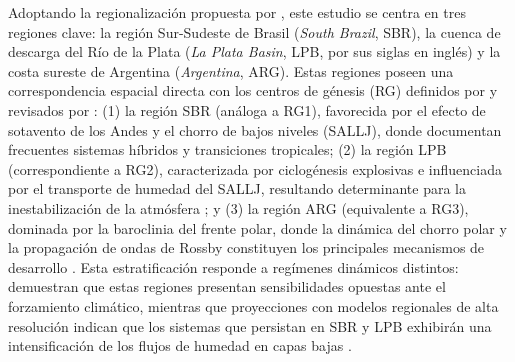 \label{sec:definicion_regiones}%
Adoptando la regionalización propuesta por \citet{gramcianinov2019properties}, este estudio se centra en tres regiones clave: la región Sur-Sudeste de Brasil (\textit{South Brazil}, SBR), la cuenca de descarga del Río de la Plata (\textit{La Plata Basin}, LPB, por sus siglas en inglés) y la costa sureste de Argentina (\textit{Argentina}, ARG). Estas regiones poseen una correspondencia espacial directa con los centros de génesis (RG) definidos por \citet{reboita2010south} y revisados por \citet{reboita2026meteorology}: (1) la región SBR (análoga a RG1), favorecida por el efecto de sotavento de los Andes y el chorro de bajos niveles (SALLJ), donde \citet{reboita2022from} documentan frecuentes sistemas híbridos y transiciones tropicales; (2) la región LPB (correspondiente a RG2), caracterizada por ciclogénesis explosivas e influenciada por el transporte de humedad del SALLJ, resultando determinante para la inestabilización de la atmósfera \citep{crespo2020potential}; y (3) la región ARG (equivalente a RG3), dominada por la baroclinia del frente polar, donde la dinámica del chorro polar y la propagación de ondas de Rossby constituyen los principales mecanismos de desarrollo \citep{simmonds2000variability}. Esta estratificación responde a regímenes dinámicos distintos: \citet{dejesus2021multimodel} demuestran que estas regiones presentan sensibilidades opuestas ante el forzamiento climático, mientras que proyecciones con modelos regionales de alta resolución indican que los sistemas que persistan en SBR y LPB exhibirán una intensificación de los flujos de humedad en capas bajas \citep{gramcianinov2024early}.

